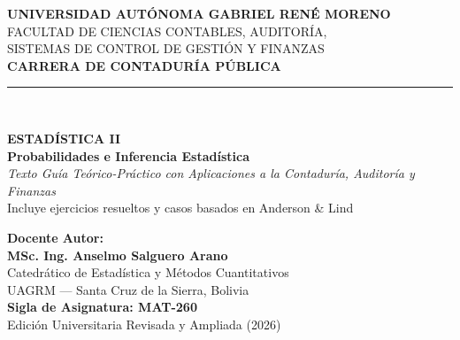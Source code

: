 \begin{titlepage}

\vspace{-1.5cm}
\begin{flushright}
    {\scshape\large\bfseries UNIVERSIDAD AUTÓNOMA GABRIEL RENÉ MORENO}\\[0.2cm]
    {\scshape\normalsize FACULTAD DE CIENCIAS CONTABLES, AUDITORÍA,}\\
    {\scshape\normalsize SISTEMAS DE CONTROL DE GESTIÓN Y FINANZAS}\\[0.2cm]
    {\scshape\small\bfseries CARRERA DE CONTADURÍA PÚBLICA}\\[0.8cm]
    \rule{0.75\textwidth}{1.5pt}\\[0.4cm]
    
    \vspace{2.5cm}
    
    {\Huge\bfseries\color{UAGRMBlue} ESTADÍSTICA II}\\[0.5cm]
    {\LARGE\bfseries\color{UAGRMRed} Probabilidades e Inferencia Estadística}\\[0.4cm]
    {\large\itshape Texto Guía Teórico-Práctico con Aplicaciones a la Contaduría, Auditoría y Finanzas}\\[0.6cm]
    {\small\sffamily\color{gray} Incluye ejercicios resueltos y casos basados en Anderson \& Lind}\\[2.0cm]
    
    \vfill
    
    \begin{minipage}{0.65\textwidth}
        \flushright
        \textbf{\large Docente Autor:}\\[0.15cm]
        {\Large\bfseries\color{UAGRMDark} MSc. Ing. Anselmo Salguero Arano}\\[0.2cm]
        {\small Catedrático de Estadística y Métodos Cuantitativos\\
        UAGRM — Santa Cruz de la Sierra, Bolivia}\\[0.8cm]
        {\bfseries\color{UAGRMBlue} Sigla de Asignatura: MAT-260}\\[0.1cm]
        {\small Edición Universitaria Revisada y Ampliada (2026)}
    \end{minipage}
\end{flushright}
\end{titlepage}

\cleardoublepage
